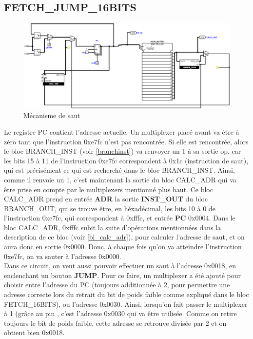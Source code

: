 \documentclass[a4paper]{article} %
\begin{document}
\subsection{FETCH\_JUMP\_16BITS}
\begin{figure}[H]
    \centering
    \includegraphics[width=1\textwidth]{src/FETCH_JUMP.png}
    \caption{Mécanisme de saut}
    \label{fetch_jump}
\end{figure}
Le registre PC contient l'adresse actuelle. Un multiplexer placé avant va être à zéro tant que l'instruction 0xe7fc n'est pas rencontrée. Si elle est rencontrée, alors le bloc BRANCH\_INST (voir \ref{branchinst}) va renvoyer un 1 à sa sortie op, car les bits 15 à 11 de l'instruction 0xe7fc correspondent à 0x1c (instruction de saut), qui est précisément ce qui est recherché dans le bloc BRANCH\_INST. Ainsi, comme il renvoie un 1, c'est maintenant la sortie du bloc CALC\_ADR qui va être prise en compte par le multiplexers mentionné plus haut. Ce bloc CALC\_ADR prend en entrée \textbf{ADR} la sortie \textbf{INST\_OUT} du bloc BRANCH\_OUT, qui se trouve être, en héxadécimal, les bits 10 à 0 de l'instruction 0xe7fc, qui correspondent à 0xfffc, et entrée \textbf{PC} 0x0004. Dans le bloc CALC\_ADR, 0xfffc subit la suite d'opérations mentionnées dans la description de ce bloc (voir \ref{bl_calc_adr}), pour calculer l'adresse de saut, et on aura donc en sortie 0x0000. Donc, à chaque fois qu'on va atteindre l'instruction 0xe7fc, on va sauter à l'adresse 0x0000.
\\
Dans ce circuit, on veut aussi pouvoir effectuer un saut à l'adresse 0x0018, en enclenchant un bouton \textbf{JUMP}. Pour ce faire, un multiplexer a été ajouté pour choisir entre l'adresse du PC (toujours additionnée à 2, pour permettre une adresse correcte lors du retrait du bit de poids faible comme expliqué dans le bloc FETCH\_16BITS), ou l'adresse 0x0030. Ainsi, lorsqu'on fait passer le multiplexer à 1 (grâce au pin , c'est l'adresse 0x0030 qui va être utilisée. Comme on retire toujours le bit de poids faible, cette adresse se retrouve divisée par 2 et on obtient bien 0x0018.
\end{document}
